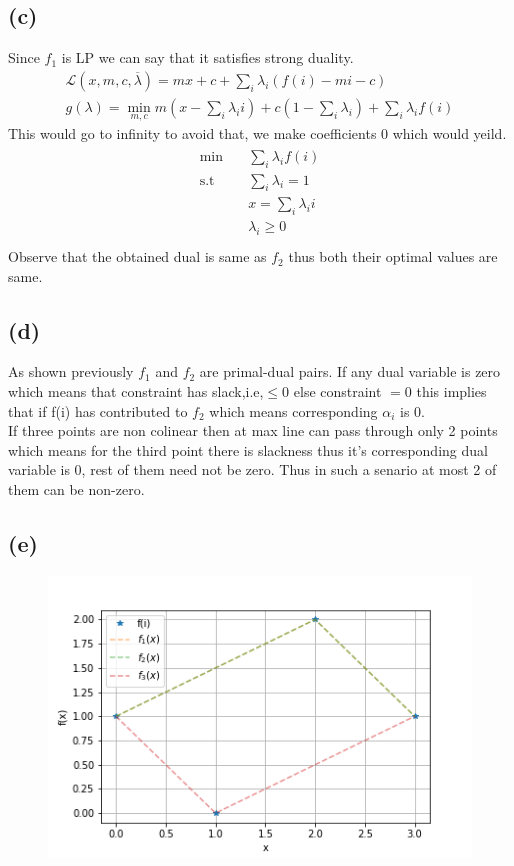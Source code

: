 \documentclass{article}
\begin{document}
\subsection*{(c)}
Since $f_1$ is LP we can say that it satisfies strong duality.
\begin{gather*}
	\mathcal{L}(x, m, c, \overline{\lambda}) = mx + c + \sum_{i}\lambda _i (f(i) - mi - c)\\
	g(\lambda) = \min _{m, c} m(x - \sum_{i}\lambda _i i) + c(1-\sum_{i}\lambda _i) + \sum_{i}\lambda _i f(i)
\end{gather*}
This would go to infinity to avoid that, we make coefficients 0 which would yeild.
\begin{gather*}
	\begin{aligned}
		\min \quad & \sum_{i}\lambda _i f(i)\\
		\textrm{s.t} \quad & \sum_{i}\lambda _i=1\\
		& x = \sum_{i}\lambda _i i\\
		& \lambda _i \ge 0\\
	\end{aligned}
\end{gather*}
Observe that the obtained dual is same as $f_2$ thus both their optimal values are same.
\subsection*{(d)}
As shown previously $f_1$ and $f_2$ are primal-dual pairs. If any dual variable is zero which means that constraint has slack,i.e,$\le0$ else constraint $=0$ this implies that if f(i) has contributed to $f_2$ which means corresponding $\alpha _i$ is 0.\\
If three points are non colinear then at max line can pass through only 2 points which means for the third point there is slackness thus it's corresponding dual variable is 0, rest of them need not be zero. Thus in such a senario at most 2 of them can be non-zero.
\subsection*{(e)}
\begin{figure}[H]
	\includegraphics[scale=1]{./figs/q5.png}
\end{figure}
\end{document}

